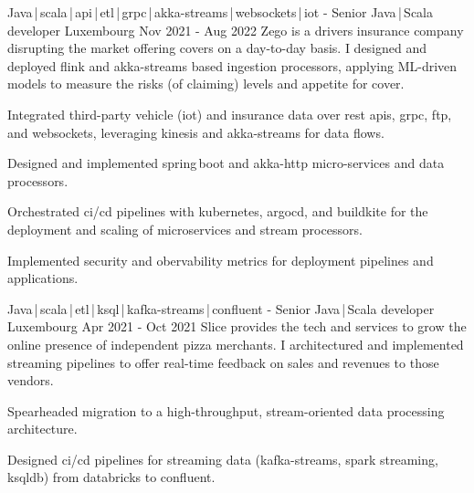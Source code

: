 \begin{cventries}

    \cventry
    {Java\,|\,scala\,|\,api\,|\,etl\,|\,grpc\,|\,akka-streams\,|\,websockets\,|\,iot}
    { - Senior Java\,|\,Scala developer}
    {Luxembourg}
    {Nov 2021 - Aug 2022}
    {Zego is a drivers insurance company disrupting the market offering covers on a day-to-day basis. I designed and deployed flink and akka-streams based ingestion processors, applying ML-driven models to measure the risks (of claiming) levels and appetite for cover.}
    {
        \begin{cvitems}
            \item{Integrated third-party vehicle (iot) and insurance data over rest apis, grpc, ftp, and websockets, leveraging kinesis and akka-streams for data flows.}
            \item{Designed and implemented spring\,boot and akka-http micro-services and data processors.}
            \item{Orchestrated ci/cd pipelines with kubernetes, argocd, and buildkite for the deployment and scaling of microservices and stream processors.}
            \item{Implemented security and obervability metrics for deployment pipelines and applications.}
        \end{cvitems}
    }


    \cventry
    {Java\,|\,scala\,|\,etl\,|\,ksql\,|\,kafka-streams\,|\,confluent}
    { - Senior Java\,|\,Scala developer}
    {Luxembourg}
    {Apr 2021 - Oct 2021}
    {Slice provides the tech and services to grow the online presence of independent pizza merchants. I architectured and implemented streaming pipelines to offer real-time feedback on sales and revenues to those vendors.}
    {
        \begin{cvitems}
            \item{Spearheaded migration to a high-throughput, stream-oriented data processing architecture.}
            \item{Designed ci/cd pipelines for streaming data (kafka-streams, spark streaming, ksqldb) from databricks to confluent.}
        \end{cvitems}
    }


\end{cventries}
